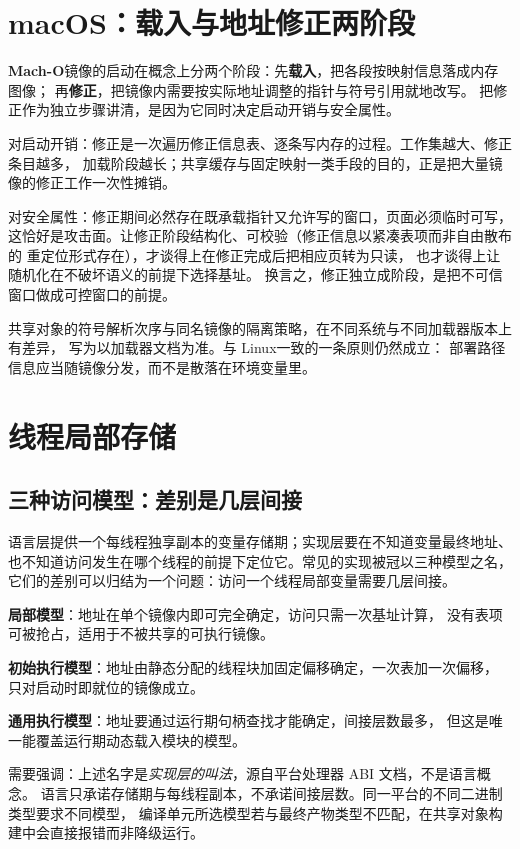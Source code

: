 \documentclass[12pt,a4paper,fontset=fandol]{ctexbook}
\newcommand{\Macho}{\textbf{\textsf{Mach-O}}}
\newcommand{\Nix}{\textsf{Linux}}
\newcommand{\Mac}{\textsf{macOS}}
\begin{document}
\section{\Mac：载入与地址修正两阶段}\label{sec:cl09-macos}

\Macho 镜像的启动在概念上分两个阶段：先\textbf{载入}，把各段按映射信息落成内存图像；
再\textbf{修正}，把镜像内需要按实际地址调整的指针与符号引用就地改写。
把修正作为独立步骤讲清，是因为它同时决定启动开销与安全属性。

对启动开销：修正是一次遍历修正信息表、逐条写内存的过程。工作集越大、修正条目越多，
加载阶段越长；共享缓存与固定映射一类手段的目的，正是把大量镜像的修正工作一次性摊销。

对安全属性：修正期间必然存在既承载指针又允许写的窗口，页面必须临时可写，
这恰好是攻击面。让修正阶段结构化、可校验（修正信息以紧凑表项而非自由散布的
重定位形式存在），才谈得上在修正完成后把相应页转为只读，
也才谈得上让随机化在不破坏语义的前提下选择基址。
换言之，修正独立成阶段，是把不可信窗口做成可控窗口的前提。

共享对象的符号解析次序与同名镜像的隔离策略，在不同系统与不同加载器版本上有差异，
写为以加载器文档为准。与 \Nix 一致的一条原则仍然成立：
部署路径信息应当随镜像分发，而不是散落在环境变量里。

\section{线程局部存储}\label{sec:cl09-tls}

\subsection{三种访问模型：差别是几层间接}

语言层提供一个每线程独享副本的变量存储期；实现层要在不知道变量最终地址、
也不知道访问发生在哪个线程的前提下定位它。常见的实现被冠以三种模型之名，
它们的差别可以归结为一个问题：访问一个线程局部变量需要几层间接。

\textbf{局部模型}：地址在单个镜像内即可完全确定，访问只需一次基址计算，
没有表项可被抢占，适用于不被共享的可执行镜像。

\textbf{初始执行模型}：地址由静态分配的线程块加固定偏移确定，一次表加一次偏移，
只对启动时即就位的镜像成立。

\textbf{通用执行模型}：地址要通过运行期句柄查找才能确定，间接层数最多，
但这是唯一能覆盖运行期动态载入模块的模型。

需要强调：上述名字是\emph{实现层的叫法}，源自平台处理器 ABI 文档，不是语言概念。
语言只承诺存储期与每线程副本，不承诺间接层数。同一平台的不同二进制类型要求不同模型，
编译单元所选模型若与最终产物类型不匹配，在共享对象构建中会直接报错而非降级运行。
\end{document}
